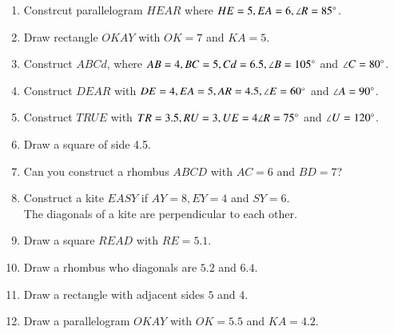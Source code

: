 \documentclass[journal,12pt,twocolumn]{IEEEtran}
\renewcommand\thesection{\arabic{section}}
\begin{document}
\begin{enumerate}[label=\thesection.\arabic*
,ref=\thesection.\theenumi]
\item Constrcut parallelogram $HEAR$ where $HE = 5, EA = 6, \angle R = 85 \degree$.
\item Draw  rectangle $OKAY$ with $OK = 7$ and $KA = 5$.
\item Construct $ABCd $, where $AB = 4, BC = 5, Cd = 6.5, \angle B = 105 \degree$ and $\angle C = 80\degree$.
\item Construct $DEAR$ with $DE = 4, EA = 5, AR = 4.5, \angle E = 60 \degree$ and $\angle A = 90 \degree$.\item Construct $TRUE$ with $TR = 3.5, RU = 3, UE = 4 \angle R = 75\degree$ and $\angle U = 120\degree$.
\item Draw a square of side 4.5.

\item Can you construct a rhombus $ABCD$ with $AC = 6$ and $BD = 7$?
\item Construct a kite $EASY$ if $AY = 8, EY = 4$ and $SY = 6$.
\\
\solution The diagonals of a kite are perpendicular to each other.
\item Draw a square $READ$ with $RE = 5.1$.
\item Draw a rhombus who diagonals are $5.2$ and $6.4$.
\item Draw a rectangle with adjacent sides $5$ and $4$.
\item Draw a parallelogram $OKAY$ with $OK = 5.5$ and $KA = 4.2$.

\end{enumerate}
\end{document}
